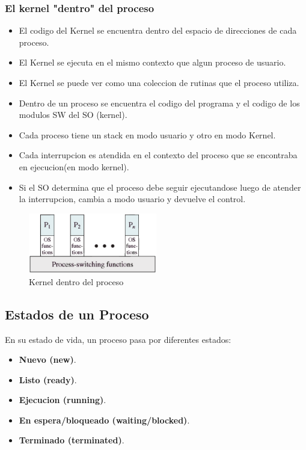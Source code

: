 \subsubsection{El kernel "dentro" del proceso}
\begin{itemize}
    \item El codigo del Kernel se encuentra dentro del espacio de direcciones de cada proceso.
    \item El Kernel se ejecuta en el mismo contexto que algun proceso de usuario.
    \item El Kernel se puede ver como una coleccion de rutinas que el proceso utiliza.
    \item Dentro de un proceso se encuentra el codigo del programa y el codigo de los modulos SW del SO (kernel).
    \item Cada proceso tiene un stack en modo usuario y otro en modo Kernel. 
    \item Cada interrupcion es atendida en el contexto del proceso que se encontraba en ejecucion(en modo kernel).
    \item Si el SO determina que el proceso debe seguir ejecutandose luego de atender la interrupcion, cambia a modo usuario y devuelve el control.
\end{itemize}
\vspace{2cm}
\begin{figure}[ht]
    \begin{center}
        \includegraphics[width=0.50\textwidth]{assets/Kernel2.eps}
    \end{center}
    \caption{Kernel dentro del proceso}\label{fig:}
\end{figure}

\subsection{Estados de un Proceso}
En su estado de vida, un proceso pasa por diferentes estados:
\begin{itemize}
    \item \textbf{Nuevo (new)}.
    \item \textbf{Listo (ready)}.
    \item \textbf{Ejecucion (running)}.
    \item \textbf{En espera/bloqueado (waiting/blocked)}.
    \item \textbf{Terminado (terminated)}.
\end{itemize}

